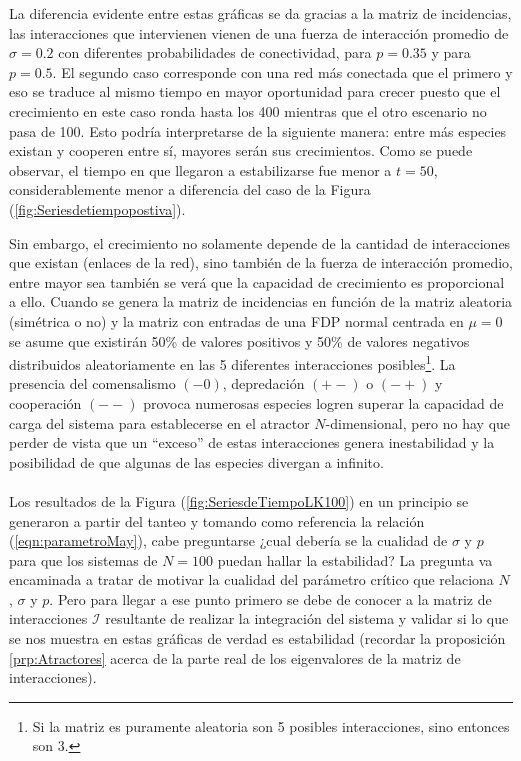 La diferencia evidente entre estas gráficas se da gracias a la matriz de incidencias, las interacciones que intervienen vienen de una fuerza de interacción promedio de $\sigma=0.2$ con diferentes probabilidades de conectividad, para $p=0.35$ y para $p=0.5$. El segundo caso corresponde con una red más conectada que el primero y eso se traduce al mismo tiempo en mayor oportunidad para crecer puesto que el crecimiento en este caso ronda hasta los 400 mientras que el otro escenario no pasa de 100. Esto podría interpretarse de la siguiente manera: entre más especies existan y cooperen entre sí, mayores serán sus crecimientos. Como se puede observar, el tiempo en que llegaron a estabilizarse fue menor a $t=50$, considerablemente menor a diferencia del caso de la Figura (\ref{fig:Seriesdetiempopostiva}). 

Sin embargo, el crecimiento no solamente depende de la cantidad de interacciones que existan (enlaces de la red), sino también de la fuerza de interacción promedio, entre mayor sea también se verá que la capacidad de crecimiento es proporcional a ello. Cuando se genera la matriz de incidencias en función de la matriz aleatoria (simétrica o no) y la matriz con entradas de una FDP normal centrada en $\mu=0$ se asume que existirán 50\% de valores positivos y 50\% de valores negativos distribuidos aleatoriamente en las 5 diferentes interacciones posibles\footnote{Si la matriz es puramente aleatoria son 5 posibles interacciones, sino entonces son 3.}. La presencia del comensalismo $(-0)$, depredación $(+-)$ o $(-+)$ y cooperación $(--)$ provoca numerosas especies logren superar la capacidad de carga del sistema para establecerse en el atractor $N$-dimensional, pero no hay que perder de vista que un ``exceso'' de estas interacciones genera inestabilidad y la posibilidad de que algunas de las especies divergan a infinito.
\\
\\
Los resultados de la Figura (\ref{fig:SeriesdeTiempoLK100}) en un principio se generaron a partir del tanteo y tomando como referencia la relación (\ref{eqn:parametroMay}), cabe preguntarse ¿cual debería se la cualidad de $\sigma$ y $p$ para que los sistemas de $N=100$ puedan hallar la estabilidad? La pregunta va encaminada a tratar de motivar la cualidad del parámetro crítico que relaciona $N$, $\sigma$ y $p$. Pero para llegar a ese punto primero se debe de conocer a la matriz de interacciones $\mathcal{I}$ resultante de realizar la integración del sistema y validar si lo que se nos muestra en estas gráficas de verdad es estabilidad (recordar la proposición \ref{prp:Atractores} acerca de la parte real de los eigenvalores de la matriz de interacciones).

